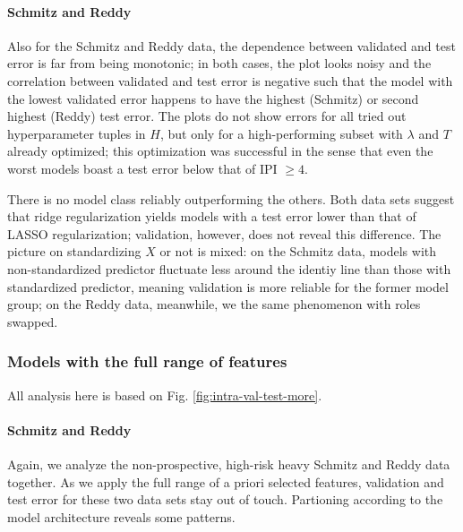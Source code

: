\paragraph{Schmitz and Reddy}
Also for the Schmitz and Reddy data, the dependence between validated and test error is far from 
being monotonic; in both cases, the plot looks noisy and the correlation between validated and test 
error is negative such that the model with the lowest validated error happens to have the highest 
(Schmitz) or second highest (Reddy) test error. The plots do not show errors for all tried out 
hyperparameter tuples in $H$, but only for a high-performing subset with $\lambda$ and $T$ already 
optimized; this optimization was successful in the sense that even the worst models boast a test 
error below that of IPI $\geq 4$.

There is no model class reliably outperforming the others. Both data sets suggest that ridge 
regularization yields models with a test error lower than that of LASSO regularization; validation, 
however, does not reveal this difference. The picture on standardizing $X$ or not is mixed: on the 
Schmitz data, models with non-standardized predictor fluctuate less around the identiy line than 
those with standardized predictor, meaning validation is more reliable for the former model group;
on the Reddy data, meanwhile, we the same phenomenon with roles swapped.

\subsubsection{Models with the full range of features}



All analysis here is based on Fig. \ref{fig:intra-val-test-more}.

\paragraph{Schmitz and Reddy}
Again, we analyze the non-prospective, high-risk heavy Schmitz and Reddy data together. As we apply
the full range of a priori selected features, validation and test error for these two data sets 
stay out of touch. Partioning according to the model architecture reveals some patterns. 

